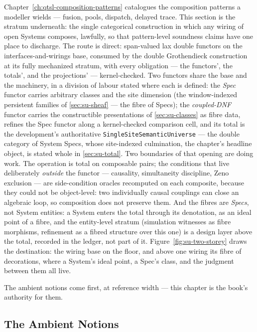 Chapter~\ref{ch:qtsl-composition-patterns} catalogues the
composition patterns a modeller wields --- fusion, pools, dispatch,
delayed trace. This section is the stratum underneath: the single
categorical construction in which any wiring of open Systems composes,
lawfully, so that pattern-level soundness claims have one place to
discharge. The route is direct: span-valued lax double
functors on the interfaces-and-wirings base,
consumed by the double Grothendieck
construction at its fully mechanized stratum, with every obligation
--- the functors', the totals', and the projections' ---
kernel-checked. Two functors share the base and the machinery, in a
division of labour stated where each is defined: the
\emph{Spec} functor carries arbitrary classes and the site
dimension (the window-indexed persistent families of
\autoref{sec:su-sheaf} --- the fibre of Specs); the
\emph{coupled-DNF} functor carries
the constructible presentations of \autoref{sec:su-classes} as
fibre data,
refines the Spec functor along a kernel-checked comparison cell,
and its total is the development's authoritative
\texttt{SingleSiteSemanticUniverse} --- the double category of System Specs,
whose site-indexed culmination, the chapter's headline object, is
stated whole in \autoref{sec:su-total}.
Two boundaries of that opening are doing
work. The
operation is total on composable pairs; the conditions that live
deliberately \emph{outside} the functor --- causality, simultaneity
discipline, Zeno exclusion --- are side-condition oracles recomputed
on each composite, because they could not be object-level: two
individually causal couplings can close an algebraic loop, so
composition does not preserve them. And the fibres are \emph{Specs},
not System entities: a System enters the total through
its denotation, as an ideal point of a fibre, and the entity-level
stratum (simulation witnesses as fibre morphisms, refinement as a
fibred structure over this one) is a design layer above the
total, recorded in the ledger, not part of it.
Figure~\ref{fig:su-two-storey} draws the destination: the wiring base
on the floor, and above one wiring its fibre of decorations, where a
System's ideal point, a Spec's class, and the judgment between them
all live.

The ambient notions come first, at reference width --- this chapter
is the book's authority for them.

\subsection{The Ambient Notions}

